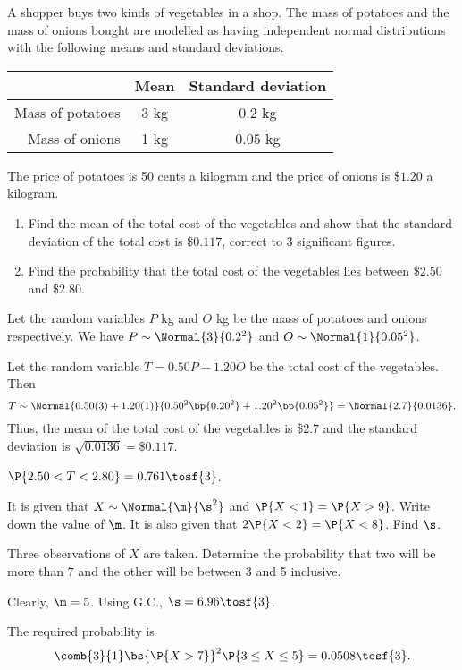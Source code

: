 \begin{problem}
    A shopper buys two kinds of vegetables in a shop. The mass of potatoes and the mass of onions bought are modelled as having independent normal distributions with the following means and standard deviations.

    \begin{table}[H]
        \centering
        \begin{tabular}{|r|c|c|}
        \hline
         & Mean & Standard deviation \\ \hline
        Mass of potatoes & 3 kg & $0.2$ kg \\ \hline
        Mass of onions & 1 kg & $0.05$ kg \\ \hline
        \end{tabular}
    \end{table}

    The price of potatoes is 50 cents a kilogram and the price of onions is \$$1.20$ a kilogram.

    \begin{enumerate}
        \item Find the mean of the total cost of the vegetables and show that the standard deviation of the total cost is \$$0.117$, correct to 3 significant figures.
        \item Find the probability that the total cost of the vegetables lies between \$$2.50$ and \$$2.80$.
    \end{enumerate}
\end{problem}
\begin{solution}
    \begin{ppart}
        Let the random variables $P$ kg and $O$ kg be the mass of potatoes and onions respectively. We have $P \sim \Normal{3}{0.2^2}$ and $O \sim \Normal{1}{0.05^2}$.

        Let the random variable $T = 0.50 P + 1.20 O$ be the total cost of the vegetables. Then \[T \sim \Normal{0.50(3) + 1.20(1)}{0.50^2 \bp{0.20^2} + 1.20^2 \bp{0.05^2}} = \Normal{2.7}{0.0136}.\] Thus, the mean of the total cost of the vegetables is \$$2.7$ and the standard deviation is $\sqrt{0.0136} = \$0.117$.
    \end{ppart}
    \begin{ppart}
        $\P{2.50 < T < 2.80} = 0.761 \tosf{3}$.
    \end{ppart}
\end{solution}

\begin{problem}
    It is given that $X \sim \Normal{\m}{\s^2}$ and $\P{X < 1} = \P{X > 9}$. Write down the value of $\m$. It is also given that $2\P{X < 2} = \P{X < 8}$. Find $\s$.

    Three observations of $X$ are taken. Determine the probability that two will be more than 7 and the other will be between 3 and 5 inclusive.
\end{problem}
\begin{solution}
    Clearly, $\m = 5$. Using G.C., $\s = 6.96 \tosf{3}$.

    The required probability is \[\comb{3}{1} \bs{\P{X > 7}}^2 \P{3 \leq X \leq 5} = 0.0508 \tosf{3}.\]
\end{solution}

